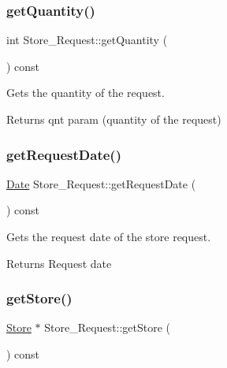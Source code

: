 \subsubsection{\texorpdfstring{get\+Quantity()}{getQuantity()}}
{\footnotesize\ttfamily int Store\+\_\+\+Request\+::get\+Quantity (\begin{DoxyParamCaption}{ }\end{DoxyParamCaption}) const}



Gets the quantity of the request. 

\begin{DoxyReturn}{Returns}
qnt param (quantity of the request) 
\end{DoxyReturn}
\mbox{\label{class_store___request_ad7e54515056bd56878bb933a4ccff2a2}} 
\subsubsection{\texorpdfstring{get\+Request\+Date()}{getRequestDate()}}
{\footnotesize\ttfamily \hyperlink{class_date}{Date} Store\+\_\+\+Request\+::get\+Request\+Date (\begin{DoxyParamCaption}{ }\end{DoxyParamCaption}) const}



Gets the request date of the store request. 

\begin{DoxyReturn}{Returns}
Request date 
\end{DoxyReturn}
\mbox{\label{class_store___request_ae288d0d554786fc94f62f432cfe8171a}} 
\subsubsection{\texorpdfstring{get\+Store()}{getStore()}}
{\footnotesize\ttfamily \hyperlink{class_store}{Store} $\ast$ Store\+\_\+\+Request\+::get\+Store (\begin{DoxyParamCaption}{ }\end{DoxyParamCaption}) const}



